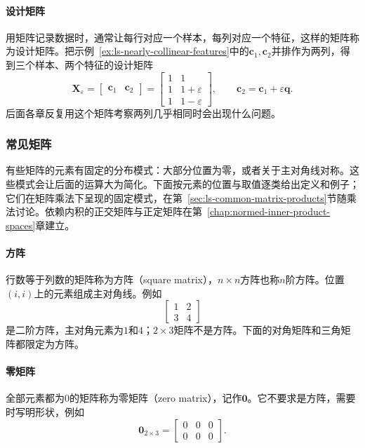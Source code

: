 \paragraph{设计矩阵}
用矩阵记录数据时，通常让每行对应一个样本，每列对应一个特征，这样的矩阵称为设计矩阵。把示例~\ref{ex:ls-nearly-collinear-features}中的$\bm c_1,\bm c_2$并排作为两列，得到三个样本、两个特征的设计矩阵
\begin{equation}
\bm X_{\varepsilon}
 =\begin{bmatrix}\bm c_1&\bm c_2\end{bmatrix}
 =\begin{bmatrix}1&1\\1&1+\varepsilon\\1&1-\varepsilon\end{bmatrix},\qquad
 \bm c_2=\bm c_1+\varepsilon\bm q.
\label{eq:linear-algebra-nearly-collinear-design}
\end{equation}
后面各章反复用这个矩阵考察两列几乎相同时会出现什么问题。

\subsubsection{常见矩阵}
\label{sec:prelim-common-matrices}

有些矩阵的元素有固定的分布模式：大部分位置为零，或者关于主对角线对称。这些模式会让后面的运算大为简化。下面按元素的位置与取值逐类给出定义和例子；它们在矩阵乘法下呈现的固定模式，在第~\ref{sec:ls-common-matrix-products}节随乘法讨论。依赖内积的正交矩阵与正定矩阵在第~\ref{chap:normed-inner-product-spaces}章建立。

\paragraph{方阵}
行数等于列数的矩阵称为方阵（square matrix），$n\times n$方阵也称$n$阶方阵。位置$(i,i)$上的元素组成主对角线。例如
\[
 \begin{bmatrix}1&2\\3&4\end{bmatrix}
\]
是二阶方阵，主对角元素为$1$和$4$；$2\times3$矩阵不是方阵。下面的对角矩阵和三角矩阵都限定为方阵。

\paragraph{零矩阵}
全部元素都为$0$的矩阵称为零矩阵（zero matrix），记作$\bm0$。它不要求是方阵，需要时写明形状，例如
\[
 \bm0_{2\times3}=\begin{bmatrix}0&0&0\\0&0&0\end{bmatrix}.
\]

